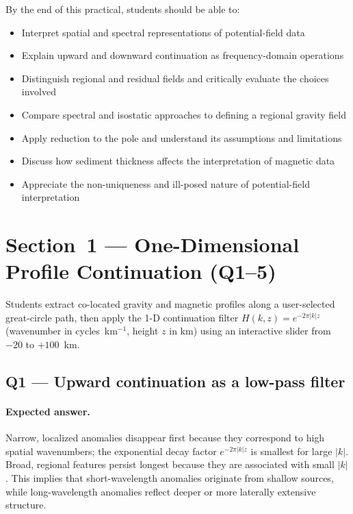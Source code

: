 \documentclass[11pt]{article}
\begin{document}
By the end of this practical, students should be able to:
\begin{itemize}
  \item Interpret spatial and spectral representations of potential-field data
  \item Explain upward and downward continuation as frequency-domain operations
  \item Distinguish regional and residual fields and critically evaluate the
        choices involved
  \item Compare spectral and isostatic approaches to defining a regional gravity
        field
  \item Apply reduction to the pole and understand its assumptions and limitations
  \item Discuss how sediment thickness affects the interpretation of magnetic data
  \item Appreciate the non-uniqueness and ill-posed nature of potential-field
        interpretation
\end{itemize}

\section{Section~1 — One-Dimensional Profile Continuation (Q1--5)}

Students extract co-located gravity and magnetic profiles along a user-selected
great-circle path, then apply the 1-D continuation filter
$H(k, z) = e^{-2\pi|k|z}$ (wavenumber in cycles~km$^{-1}$, height $z$ in km)
using an interactive slider from $-20$ to $+100$~km.

\subsection*{Q1 — Upward continuation as a low-pass filter}

\paragraph{Expected answer.}
Narrow, localized anomalies disappear first because they correspond to high
spatial wavenumbers; the exponential decay factor $e^{-2\pi|k|z}$ is smallest
for large $|k|$.  Broad, regional features persist longest because they are
associated with small $|k|$.  This implies that short-wavelength anomalies
originate from shallow sources, while long-wavelength anomalies reflect deeper or
more laterally extensive structure.
\end{document}
